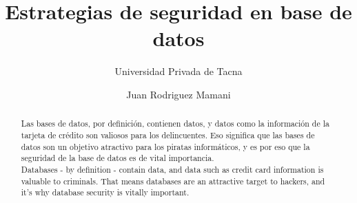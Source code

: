 \documentclass[sigconf]{acmart}
\begin{document}
\title{Estrategias de seguridad en base de datos}
\subtitle{Universidad Privada de Tacna}
\author{Juan Rodriguez Mamani}


\renewcommand{\shortauthors}{Juan Rodriguez}

\begin{abstract}
Las bases de datos, por definición, contienen datos, y datos como la información de la tarjeta de crédito son valiosos para los delincuentes. Eso significa que las bases de datos son un objetivo atractivo para los piratas informáticos, y es por eso que la seguridad de la base de datos es de vital importancia.
\vspace{10pt}\\
Databases - by definition - contain data, and data such as credit card information is valuable to criminals. That means databases are an attractive target to hackers, and it's why database security is vitally important.
\end{abstract}

\maketitle






\end{document}
